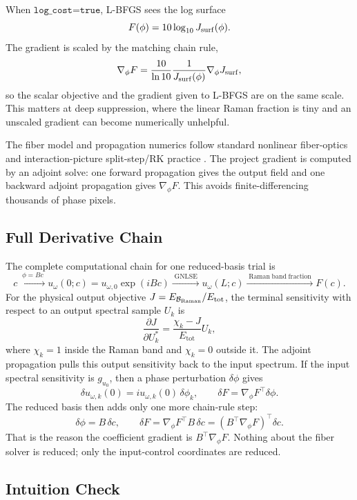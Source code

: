 \documentclass[11pt]{article}
\begin{document}
When \(\texttt{log\_cost=true}\), L-BFGS sees the log surface
\[
    F(\phi) = 10\log_{10}J_{\mathrm{surf}}(\phi).
\]
The gradient is scaled by the matching chain rule,
\[
    \nabla_\phi F
    =
    \frac{10}{\ln 10}
    \frac{1}{J_{\mathrm{surf}}(\phi)}
    \nabla_\phi J_{\mathrm{surf}},
\]
so the scalar objective and the gradient given to L-BFGS are on the same scale.
This matters at deep suppression, where the linear Raman fraction is tiny and
an unscaled gradient can become numerically unhelpful.

The fiber model and propagation numerics follow standard nonlinear fiber-optics
and interaction-picture split-step/RK practice
\cite{agrawal2019,dudley2006,hult2007}. The project gradient is computed by an
adjoint solve: one forward propagation gives the output field and one backward
adjoint propagation gives \(\nabla_\phi F\). This avoids finite-differencing
thousands of phase pixels.

\subsection*{Full Derivative Chain}

The complete computational chain for one reduced-basis trial is
\[
    c
    \xrightarrow{\;\phi = Bc\;}
    u_\omega(0;c)=u_{\omega,0}\exp(iBc)
    \xrightarrow{\;\mathrm{GNLSE}\;}
    u_\omega(L;c)
    \xrightarrow{\;\mathrm{Raman\;band\;fraction}\;}
    F(c).
\]
For the physical output objective \(J=E_{\mathcal{B}_{\mathrm{Raman}}}/E_{\mathrm{tot}}\), the
terminal sensitivity with respect to an output spectral sample \(U_k\) is
\[
    \frac{\partial J}{\partial U_k^\ast}
    =
    \frac{\chi_k-J}{E_{\mathrm{tot}}}U_k,
\]
where \(\chi_k=1\) inside the Raman band and \(\chi_k=0\) outside it. The
adjoint propagation pulls this output sensitivity back to the input spectrum.
If the input spectral sensitivity is \(g_{u_0}\), then a phase perturbation
\(\delta\phi\) gives
\[
    \delta u_{\omega,k}(0)= i u_{\omega,k}(0)\,\delta\phi_k,
    \qquad
    \delta F
    =
    \nabla_\phi F^\top \delta\phi .
\]
The reduced basis then adds only one more chain-rule step:
\[
    \delta\phi = B\,\delta c,
    \qquad
    \delta F
    =
    \nabla_\phi F^\top B\,\delta c
    =
    \left(B^\top\nabla_\phi F\right)^\top\delta c.
\]
That is the reason the coefficient gradient is \(B^\top\nabla_\phi F\).
Nothing about the fiber solver is reduced; only the input-control coordinates
are reduced.

\subsection*{Intuition Check}
\end{document}
